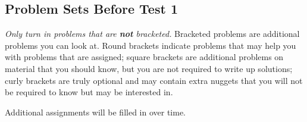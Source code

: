 \documentclass{scrartcl}
\begin{document}
\pagestyle{fancy}

\chead{}
\rhead{\thepage/\pageref{end}}
\lfoot{}
\rfoot{}

\begin{center}
  \large
%
%
\subsection*{Problem Sets Before Test 1}

\end{center}


\textit{Only turn in problems that are \textbf{not} bracketed.}
Bracketed problems are additional problems you can look at.
Round brackets indicate problems that may help you with problems that
are assigned; square brackets are additional problems on material
that you should know, but you are not required to write up solutions;
curly brackets are truly optional and may contain extra nuggets that you
will not be required to know but may be interested in.

Additional assignments will be filled in over time.

\bigskip
\end{document}
